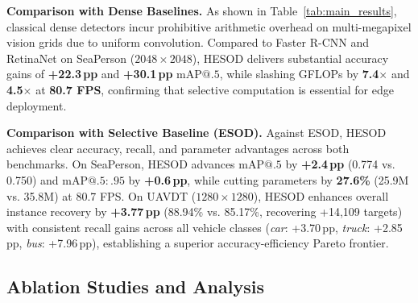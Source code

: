 \textbf{Comparison with Dense Baselines.} As shown in Table~\ref{tab:main_results}, classical dense detectors incur prohibitive arithmetic overhead on multi-megapixel vision grids due to uniform convolution. Compared to Faster R-CNN and RetinaNet on SeaPerson ($2048\times 2048$), HESOD delivers substantial accuracy gains of \textbf{+22.3\,pp} and \textbf{+30.1\,pp} $\mathrm{mAP@.5}$, while slashing GFLOPs by \textbf{7.4$\times$} and \textbf{4.5$\times$} at \textbf{80.7 FPS}, confirming that selective computation is essential for edge deployment.

\textbf{Comparison with Selective Baseline (ESOD).} Against ESOD, HESOD achieves clear accuracy, recall, and parameter advantages across both benchmarks. On SeaPerson, HESOD advances $\mathrm{mAP@.5}$ by \textbf{+2.4\,pp} (0.774 vs. 0.750) and $\mathrm{mAP@.5:.95}$ by \textbf{+0.6\,pp}, while cutting parameters by \textbf{27.6\%} (25.9M vs. 35.8M) at 80.7 FPS. On UAVDT ($1280\times 1280$), HESOD enhances overall instance recovery by \textbf{+3.77\,pp} (88.94\% vs. 85.17\%, recovering +14,109 targets) with consistent recall gains across all vehicle classes (\emph{car}: +3.70\,pp, \emph{truck}: +2.85\,pp, \emph{bus}: +7.96\,pp), establishing a superior accuracy-efficiency Pareto frontier.

\subsection{Ablation Studies and Analysis}
\label{ssec:ablation_analysis}


